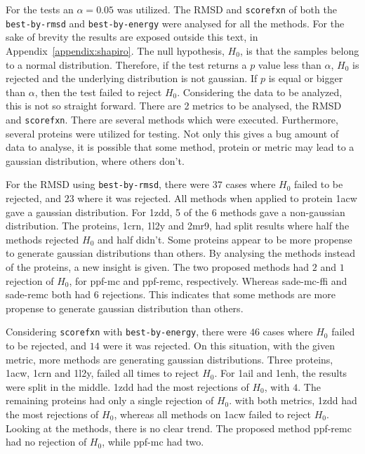 For the tests an $\alpha = 0.05$ was utilized. The RMSD and \texttt{scorefxn}
of both the \texttt{best-by-rmsd} and \texttt{best-by-energy} were analysed for
all the methods. For the sake of brevity the results are exposed outside this
text, in Appendix~\ref{appendix:shapiro}. The null hypothesis, $H_0$, is that
the samples belong to a normal distribution. Therefore, if the test returns a $p$
value less than $\alpha$, $H_0$ is rejected and the underlying distribution is
not gaussian. If $p$ is equal or bigger than $\alpha$, then the test failed to
reject $H_0$. Considering the data to be analyzed, this is not so straight
forward. There are 2 metrics to be analysed, the RMSD and \texttt{scorefxn}.
There are several methods which were executed. Furthermore, several proteins
were utilized for testing. Not only this gives a bug amount of data to analyse,
it is possible that some method, protein or metric may lead to a gaussian
distribution, where others don't.

For the RMSD using \texttt{best-by-rmsd}, there were $37$ cases where $H_0$
failed to be rejected, and $23$ where it was rejected. All methods when applied
to protein 1acw gave a gaussian distribution. For 1zdd, 5 of the 6 methods gave
a non-gaussian distribution. The proteins, 1crn, 1l2y and 2mr9, had split results
where half the methods rejected $H_0$ and half didn't. Some proteins appear to
be more propense to generate gaussian distributions than others. By analysing
the methods instead of the proteins, a new insight is given. The two proposed
methods had $2$ and $1$ rejection of $H_0$, for ppf-mc and ppf-remc,
respectively. Whereas sade-mc-ffi and sade-remc both had $6$ rejections. This
indicates that some methods are more propense to generate gaussian distribution
than others.

Considering \texttt{scorefxn} with \texttt{best-by-energy}, there were $46$
cases where $H_0$ failed to be rejected, and $14$ were it was rejected. On this
situation, with the given metric, more methods are generating gaussian
distributions. Three proteins, 1acw, 1crn and 1l2y, failed all times to reject $H_0$.
For 1ail and 1enh, the results were split in the middle. 1zdd had the most
rejections of $H_0$, with $4$. The remaining proteins had only a single
rejection of $H_0$. with both metrics, 1zdd had the most rejections of $H_0$,
whereas all methods on 1acw failed to reject $H_0$. Looking at the methods,
there is no clear trend. The proposed method ppf-remc had no rejection
of $H_0$, while ppf-mc had two.

